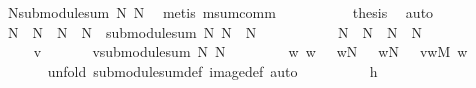 \begin{isabellebody}
\ {}{}{\isacharcolon}\ {\isachardoublequoteopen}N{}{\isasymsubseteq}submodule{\isacharunderscore}sum\ N{}\ N{}{\isachardoublequoteclose}\ \isamarkupfalse%
\ {\isacharparenleft}metis\ msum{\isacharunderscore}comm{\isacharparenright}\isanewline
\ \ \ \ \isamarkupfalse%
\ {}{}\ {}{}\ {}{}\ \isamarkupfalse%
\ {\isacharquery}thesis\ \isamarkupfalse%
\ auto\isanewline
\ \ \isamarkupfalse%
\isanewline
\ \ \isamarkupfalse%
\ {}{\isacharcolon}\ {\isachardoublequoteopen}N{}\ {\isasymsubseteq}\ N\ {\isasymand}\ N{}\ {\isasymsubseteq}\ N\ {\isasymLongrightarrow}\ {\isacharparenleft}submodule{\isacharunderscore}sum\ N{}\ N{}{\isacharparenright}\ {\isasymsubseteq}\ N{\isachardoublequoteclose}\isanewline
\ \ \isamarkupfalse%
\ {\isacharminus}\isanewline
\ \ \ \ \isamarkupfalse%
\ {}{}{\isacharcolon}\ {\isachardoublequoteopen}N{}\ {\isasymsubseteq}\ N\ {\isasymand}\ N{}\ {\isasymsubseteq}\ N{\isachardoublequoteclose}\isanewline
\ \ \ \ \isacommand{{\isacharbraceleft}}\isamarkupfalse%
\ \ \isanewline
\ \ \ \ \isamarkupfalse%
\ v\isanewline
\ \ \ \ \isamarkupfalse%
\ {}{}{\isacharcolon}\ {\isachardoublequoteopen}v{\isasymin}submodule{\isacharunderscore}sum\ N{}\ N{}{\isachardoublequoteclose}\isanewline
\ \ \ \ \isamarkupfalse%
\ {}{}\ \isamarkupfalse%
\ w{}\ w{}\ \ {}{}{\isacharcolon}\ {\isachardoublequoteopen}w{}{\isasymin}N{}{\isachardoublequoteclose}\ \ {}{}{\isacharcolon}\ {\isachardoublequoteopen}w{}{\isasymin}N{}{\isachardoublequoteclose}\ \ {}{}{\isacharcolon}\ {\isachardoublequoteopen}v{\isacharequal}w{}{\isasymoplus}\isactrlbsub M\isactrlesub \ w{}{\isachardoublequoteclose}\ \isanewline
\ \ \ \ \ \ \isamarkupfalse%
\ {\isacharparenleft}unfold\ submodule{\isacharunderscore}sum{\isacharunderscore}def\ image{\isacharunderscore}def{\isacharcomma}\ auto{\isacharparenright}\isanewline
\ \ \ \ \isamarkupfalse%
\ {}{}\ {}{}\ {}{}\ {}{}\ h{}\ \isamarkupfalse%

\end{isabellebody}
